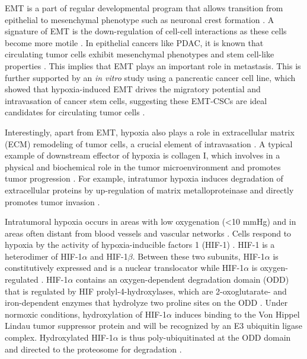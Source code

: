 \documentclass[11pts]{article}
\begin{document}
\newline
\noindent EMT is a part of regular developmental program that allows transition from epithelial to mesenchymal phenotype such as neuronal crest formation \cite{Noman:2014qf,Singh:2010ys,Hanahan2011646}. A signature of EMT is the down-regulation of cell-cell interactions as these cells become more motile \cite{18566898}. In epithelial cancers like PDAC, it is known that circulating tumor cells exhibit mesenchymal phenotypes and stem cell-like properties \cite{Rhim:2012fk}. This implies that EMT plays an important role in metastasis. This is further supported by an {\it in vitro} study using a pancreatic cancer cell line, which showed that hypoxia-induced EMT drives the migratory potential and intravasation of cancer stem cells, suggesting these EMT-CSCs are ideal candidates for circulating tumor cells \cite{10.1371/journal.pone.0046391}. 
\newline

\noindent Interestingly, apart from EMT, hypoxia also plays a role in extracellular matrix (ECM) remodeling of tumor cells, a crucial element of intravasation \cite{Gilkes:2014qf}. A typical example of downstream effector of hypoxia is collagen I, which involves in a physical and biochemical role in the tumor microenvironment and promotes tumor progression \cite{Gilkes:2014qf}. For example, intratumor hypoxia induces degradation of extracellular proteins by up-regulation of matrix metalloproteinase and directly promotes tumor invasion \cite{Krishnamachary:2003vn,MC:MC20678}.
 \newline

\newline
\noindent Intratumoral hypoxia occurs in areas with low oxygenation (\textless10 mmHg) and in areas often distant from blood vessels and vascular networks \cite{Gilkes:2014qf}. Cells respond to hypoxia by the activity of hypoxia-inducible factors 1 (HIF-1) \cite{10.1172/JCI67230}. HIF-1 is a heterodimer of HIF-1$\alpha$ and HIF-1$\beta$. Between these two subunits, HIF-1$\alpha$ is constitutively expressed and is a nuclear translocator while HIF-1$\alpha$ is oxygen-regulated \cite{10.1172/JCI67230}. HIF-1$\alpha$ contains an oxygen-dependent degradation domain (ODD) that is regulated by HIF prolyl-4-hydroxylases, which are 2-oxoglutarate- and iron-dependent enzymes that hydrolyze two proline sites on the ODD \cite{Karuppagounder:2012sf}. Under normoxic conditions, hydroxylation of HIF-1$\alpha$ induces binding to the Von Hippel Lindau tumor suppressor protein and will be recognized by an E3 ubiquitin ligase complex. Hydroxylated HIF-1$\alpha$ is thus poly-ubiquitinated at the ODD domain and directed to the proteosome for degradation \cite{Karuppagounder:2012sf}.\newline
\end{document}
